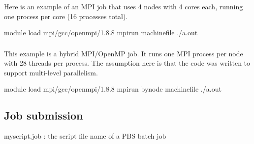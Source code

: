 \documentclass[letterpaper,10pt,english]{sphinxmanual}
\begin{document}
\subsubsection{}
\label{\detokenize{guide:simple-mpi-parallel-job}}
Here is an example of an MPI job that uses 4 nodes with 4 cores each, running one process per core (16 processes total).

\begin{sphinxVerbatim}[commandchars=\\\{\}]

module load mpi/gcc/openmpi/1.8.8
 
mpirun \PYGZhy{}machinefile  ./a.out
\end{sphinxVerbatim}


\subsubsection{}
\label{\detokenize{guide:parallel-job-with-mpi-and-openmp}}
This example is a hybrid MPI/OpenMP job. It runs one MPI process per node with 28 threads per process. The assumption here is that the code was written to support multi-level parallelism.

\begin{sphinxVerbatim}[commandchars=\\\{\}]

module load mpi/gcc/openmpi/1.8.8
 
 
mpirun \PYGZhy{}\PYGZhy{}bynode \PYGZhy{}machinefile  ./a.out
\end{sphinxVerbatim}


\subsection{Job submission}
\label{\detokenize{guide:job-submission}}
myscript.job : the script file name of a PBS batch job
\end{document}

